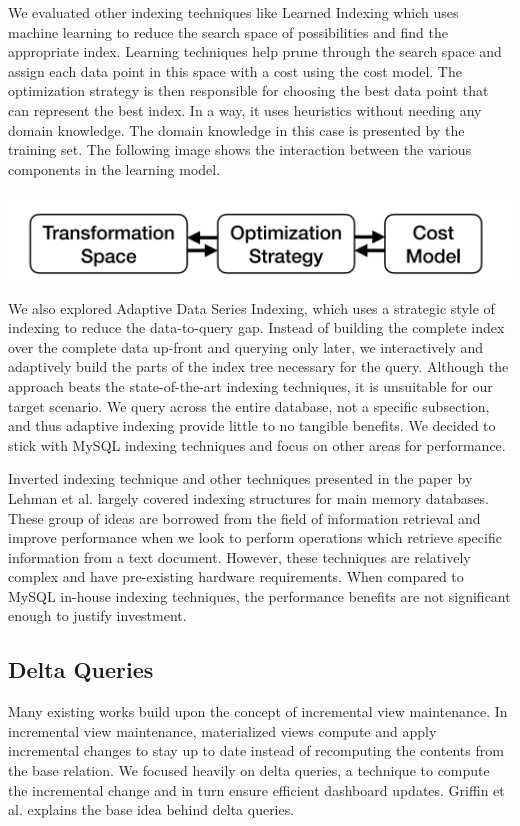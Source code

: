 We evaluated other indexing techniques like Learned Indexing\cite{LearnedIndexing} which uses machine learning to reduce the search space of possibilities and find the appropriate index. Learning techniques help prune through the search space and assign each data point in this space with a cost using the cost model. The optimization strategy is then responsible for choosing the best data point that can represent the best index. In a way, it uses heuristics without needing any domain knowledge. The domain knowledge in this case is presented by the training set. The following image shows the interaction between the various components in the learning model.
\begin{center}
    \includegraphics[scale=0.25]{ML.png}
\end{center}

We also explored Adaptive Data Series Indexing\cite{ADS}, which uses a strategic style of indexing to reduce the data-to-query gap. Instead of building the complete index over the complete data up-front and querying only later, we interactively and adaptively build the parts of the index tree necessary for the query. Although the approach beats the state-of-the-art indexing techniques, it is unsuitable for our target scenario. We query across the entire database, not a specific subsection, and thus adaptive indexing provide little to no tangible benefits. We decided to stick with MySQL indexing techniques and focus on other areas for performance.

Inverted indexing technique\cite{InvertedIndexing} and other techniques presented in the paper by Lehman et al.\cite{MainMemoryIndexStructures} largely covered indexing structures for main memory databases. These group of ideas are borrowed from the field of information retrieval and improve performance when we look to perform operations which retrieve specific information from a text document. However, these techniques are relatively complex and have pre-existing hardware requirements. When compared to MySQL in-house indexing techniques, the performance benefits are not significant enough to justify investment.

\subsection{Delta Queries}
Many existing works build upon the concept of incremental view maintenance. In incremental view maintenance, materialized views compute and apply incremental changes to stay up to date instead of recomputing the contents from the base relation. We focused heavily on delta queries\cite{IncrementalMaintenance}, a technique to compute the incremental change and in turn ensure efficient dashboard updates. Griffin et al.\cite{IVMWithDuplicates} explains the base idea behind delta queries.

